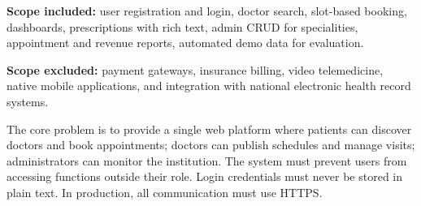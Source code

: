 \textbf{Scope included:} user registration and login, doctor search, slot-based booking, dashboards, prescriptions with rich text, admin CRUD for specialities, appointment and revenue reports, automated demo data for evaluation.

\textbf{Scope excluded:} payment gateways, insurance billing, video telemedicine, native mobile applications, and integration with national electronic health record systems.

The core problem is to provide a single web platform where patients can discover doctors and book appointments; doctors can publish schedules and manage visits; administrators can monitor the institution. The system must prevent users from accessing functions outside their role. Login credentials must never be stored in plain text. In production, all communication must use HTTPS.
